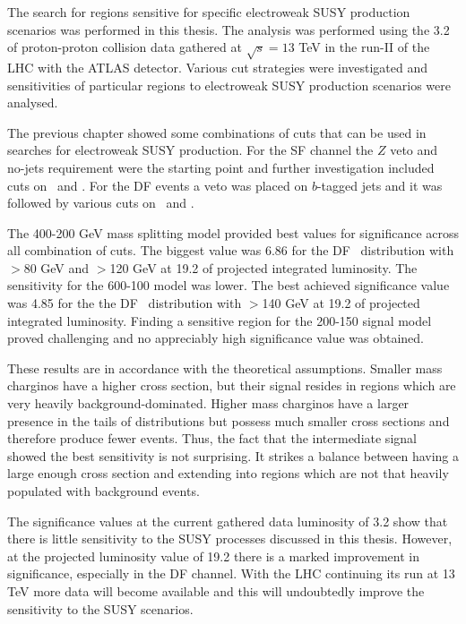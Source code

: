 The search for regions sensitive for specific electroweak SUSY production scenarios was performed in this thesis. The analysis was performed using the 3.2 \invfb of proton-proton collision data  gathered at $\sqrt{s}=13$ TeV in the run-II of the LHC with the ATLAS detector. Various cut strategies were investigated and sensitivities of particular regions to electroweak SUSY production scenarios were analysed. 

The previous chapter showed some combinations of cuts that can be used in searches for electroweak SUSY production. For the SF channel the $Z$ veto and no-jets requirement were the starting point and further investigation included cuts on \metrel \, and \mttwo. For the DF events a veto was placed on $b$-tagged jets and it was followed by various cuts on \metrel \, and \mttwo. 

The 400-200 GeV mass splitting model provided best values for significance across all combination of cuts. The biggest value was 6.86 for the DF \mttwo \, distribution  with \metrel$>$80 GeV and \mttwo$>$120 GeV at 19.2 \invfb of projected integrated luminosity.
The sensitivity for the 600-100 model was lower. The best achieved significance value was 4.85 for the the DF \mttwo \, distribution  with \mttwo$>$140 GeV at 19.2 \invfb of projected integrated luminosity. Finding a sensitive region for the 200-150 signal model proved challenging and no appreciably high significance value was obtained.

These results are in accordance with the theoretical assumptions. Smaller mass charginos have a higher cross section, but their signal resides in regions which are very heavily background-dominated. Higher mass charginos have a larger presence in the tails of distributions but possess much smaller cross sections and therefore produce fewer events. Thus, the fact that the intermediate signal showed the best sensitivity is not surprising. It strikes a balance between having a large enough cross section and extending into regions which are not that heavily populated with background events.

The significance values at the current gathered data luminosity of 3.2 \invfb show that there is little sensitivity to the SUSY processes discussed in this thesis. However, at the projected luminosity value of 19.2 \invfb there is a marked improvement in significance, especially in the DF channel. With the LHC continuing its run at 13 TeV more data will become available and this will undoubtedly improve the sensitivity to the SUSY scenarios. 







